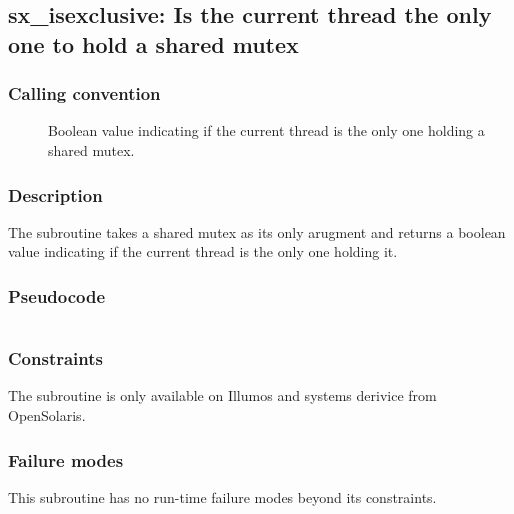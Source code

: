 \clearpage
{}
{}
\label{insn:dummy}
\subsection*{sx\_isexclusive: Is the current thread the only one to
  hold a shared mutex }

\subsubsection*{Calling convention}

\begin{description}
\item[] Boolean value indicating if the current thread
  is the only one holding a shared mutex.
\end{description}

\subsubsection*{Description}

The  subroutine takes a shared mutex as
its only arugment and returns a boolean value indicating if the
current thread is the only one holding it.

\subsubsection*{Pseudocode}

\begin{verbatim}
\end{verbatim}

\subsubsection*{Constraints}

The  subroutine is only available on
Illumos and systems derivice from OpenSolaris.

\subsubsection*{Failure modes}

This subroutine has no run-time failure modes beyond its constraints.
